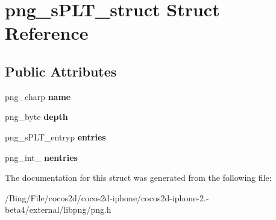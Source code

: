 \hypertarget{structpng__s_p_l_t__struct}{\section{png\-\_\-s\-P\-L\-T\-\_\-struct Struct Reference}
\label{structpng__s_p_l_t__struct}
}
\subsection*{Public Attributes}
\begin{DoxyCompactItemize}
\item 
\hypertarget{structpng__s_p_l_t__struct_af3b088b149e790b9b98ebedde69a70f0}{png\-\_\-charp {\bfseries name}}\label{structpng__s_p_l_t__struct_af3b088b149e790b9b98ebedde69a70f0}

\item 
\hypertarget{structpng__s_p_l_t__struct_a6e667882cd16c9675455cebd49898b22}{png\-\_\-byte {\bfseries depth}}\label{structpng__s_p_l_t__struct_a6e667882cd16c9675455cebd49898b22}

\item 
\hypertarget{structpng__s_p_l_t__struct_a4c7db13fb1a7f0ede434e174b20151ec}{png\-\_\-s\-P\-L\-T\-\_\-entryp {\bfseries entries}}\label{structpng__s_p_l_t__struct_a4c7db13fb1a7f0ede434e174b20151ec}

\item 
\hypertarget{structpng__s_p_l_t__struct_ac5844e98e4c43733bad6b83b54dc7a9f}{png\-\_\-int\-\_ {\bfseries nentries}}\label{structpng__s_p_l_t__struct_ac5844e98e4c43733bad6b83b54dc7a9f}

\end{DoxyCompactItemize}


The documentation for this struct was generated from the following file\-:\begin{DoxyCompactItemize}
\item 
/\-Bing/\-File/cocos2d/cocos2d-\/iphone/cocos2d-\/iphone-\/2.-\/beta4/external/libpng/png.\-h\end{DoxyCompactItemize}
